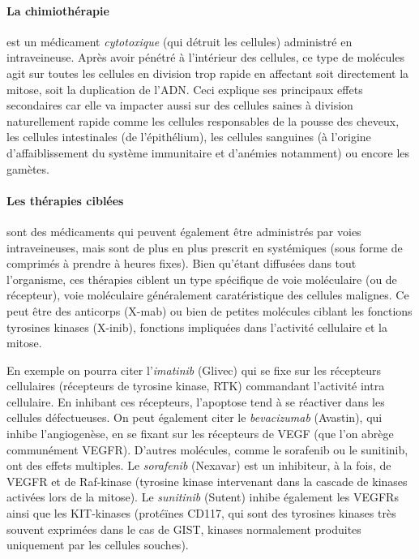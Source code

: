 \documentclass[main.tex]{subfiles}
\begin{document}
\paragraph{La chimiothérapie} est un médicament \emph{cytotoxique} (\ie qui détruit les cellules) administré en intraveineuse. 
Après avoir pénétré à l'intérieur des cellules, ce type de molécules agit 
sur toutes les cellules en division trop rapide en affectant soit directement la mitose, soit la duplication de l'ADN. Ceci explique ses principaux effets secondaires car elle va impacter aussi sur des cellules saines à division naturellement rapide comme les cellules responsables de la pousse des cheveux, les cellules intestinales (de l'épithélium), les cellules sanguines (à l'origine d'affaiblissement du système immunitaire et d'anémies notamment) ou encore les gamètes.

\paragraph{Les thérapies ciblées} sont des médicaments qui peuvent également être administrés par voies intraveineuses, mais sont de plus en plus prescrit en %
systémiques 
(\ie sous forme de comprimés à prendre à heures fixes). Bien qu'étant diffusées dans tout l'organisme, ces thérapies  ciblent un type spécifique de voie moléculaire (ou de récepteur), voie moléculaire généralement caratéristique des cellules malignes. Ce peut être des anticorps (X-mab) ou bien de petites molécules ciblant les fonctions tyrosines kinases (X-inib), fonctions impliquées dans l'activité cellulaire et la mitose. 

En exemple on pourra citer l'\emph{imatinib} (Glivec) qui se fixe sur les récepteurs cellulaires (récepteurs de tyrosine kinase, RTK) commandant l'activité intra cellulaire. En inhibant ces récepteurs, l'apoptose tend à se réactiver dans les cellules défectueuses. On peut également citer le \emph{bevacizumab} (Avastin), qui inhibe l'angiogenèse, en se fixant sur les récepteurs de VEGF (que l'on abrège communément VEGFR). D'autres molécules, comme  le sorafenib ou le sunitinib, ont des effets multiples. 
Le \emph{sorafenib} (Nexavar) est un inhibiteur, à la fois, de VEGFR et de Raf-kinase (tyrosine kinase intervenant dans la cascade de kinases activées lors de la mitose). 
Le \emph{sunitinib} (Sutent) inhibe également les VEGFRs ainsi que les KIT-kinases (protéïnes CD117, qui sont des tyrosines kinases très souvent exprimées dans le cas de GIST, kinases normalement produites uniquement par les cellules souches).
\end{document}

